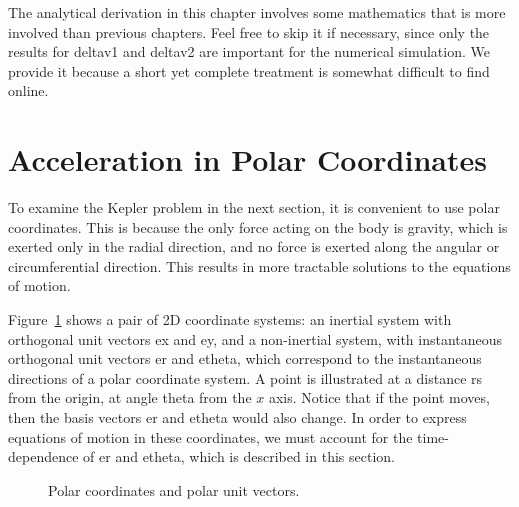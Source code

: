 \documentclass[12pt,openany]{book}
\begin{document}
The analytical derivation in this chapter involves some mathematics that is more involved than previous chapters. Feel free to skip it if necessary, since only the results for \gls{deltav1} and \gls{deltav2} are important for the numerical simulation. We provide it because a short yet complete treatment is somewhat difficult to find online.

\section{Acceleration in Polar Coordinates}

To examine the Kepler problem in the next section, it is convenient to use polar coordinates. This is because the only force acting on the body is gravity, which is exerted only in the radial direction, and no force is exerted along the angular or circumferential direction. This results in more tractable solutions to the equations of motion.

Figure~\ref{fig:polar} shows a pair of 2D coordinate systems: an inertial system with orthogonal unit vectors \gls{ex} and \gls{ey}, and a non-inertial system, with instantaneous orthogonal unit vectors \gls{er} and \gls{etheta}, which correspond to the instantaneous directions of a polar coordinate system. A point is illustrated at a distance \gls{rs} from the origin, at angle \gls{theta} from the \(x\) axis. Notice that if the point moves, then the basis vectors \gls{er} and \gls{etheta} would also change. In order to express equations of motion in these coordinates, we must account for the time-dependence of \gls{er} and \gls{etheta}, which is described in this section.

\begin{figure}[htbp]
  \centering
  \caption{Polar coordinates and polar unit vectors.}
  \label{fig:polar}
\end{figure}
\end{document}
